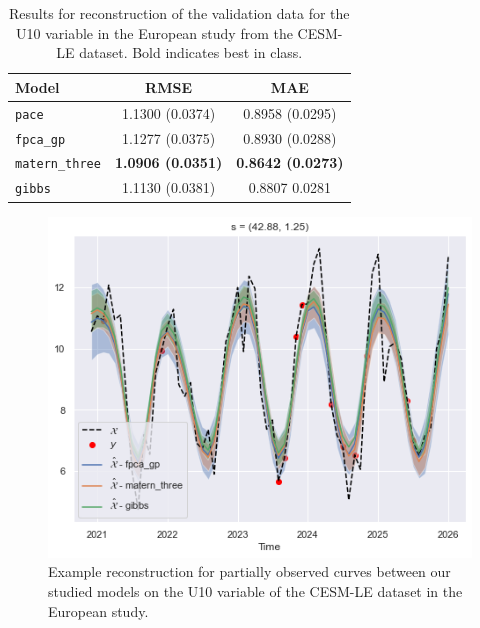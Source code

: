 \begin{table}
	\caption[Results for U10 variable on validation data in the European study]{Results for reconstruction of the validation data for the U10 variable in the European study from the CESM-LE dataset. Bold indicates best in class.}
	\centering
	\label{tab:train_cesm_u10_eur}
	\begin{tabular}{lcc}
		\toprule
		\textbf{Model} & \textbf{RMSE} & \textbf{MAE} \\
		\midrule
		\verb*|pace| & 1.1300 (0.0374) & 0.8958	(0.0295) \\
		\verb*|fpca_gp| & 1.1277 (0.0375) & 0.8930 (0.0288) \\
		\verb*|matern_three| & \textbf{1.0906 (0.0351)} & \textbf{0.8642 (0.0273)}\\
		\verb*|gibbs| & 1.1130 (0.0381) & 0.8807	0.0281\\
		\bottomrule
	\end{tabular}
\end{table}

\begin{figure}
	\centering
	\includegraphics[width=\textwidth]{train_ex_u10_eur}
	\caption{Example reconstruction for partially observed curves between our studied models on the U10 variable of the CESM-LE dataset in the European study.}
	\label{fig:train_ex_u10_eur}
\end{figure}

